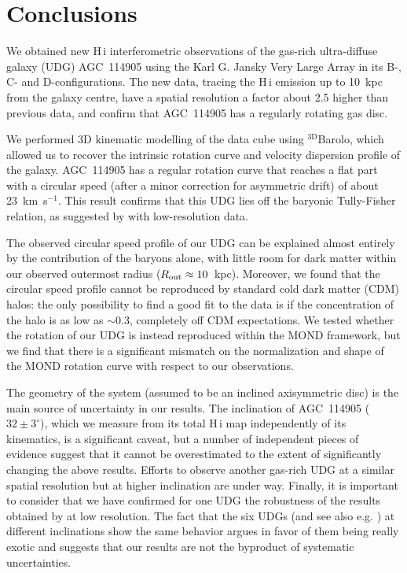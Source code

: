 \documentclass[fleqn,usenatbib]{mnras}
\begin{document}
\section{Conclusions}
\label{sec:conclusions}
We obtained new H\,{\sc i} interferometric observations of the gas-rich ultra-diffuse galaxy (UDG) AGC~114905 using the Karl G. Jansky Very Large Array in its B-, C- and D-configurations. The new data, tracing the H\,{\sc i} emission up to 10~kpc from the galaxy centre, have a spatial resolution a factor about 2.5 higher than previous data, and confirm that AGC~114905 has a regularly rotating gas disc.

We performed 3D kinematic modelling of the data cube using $\mathrm{^{3D}}$Barolo, which allowed us to recover the intrinsic rotation curve and velocity dispersion profile of the galaxy. AGC~114905 has a regular rotation curve that reaches a flat part with a circular speed (after a minor correction for asymmetric drift) of about 23~km~s$^{-1}$. This result confirms that this UDG lies off the baryonic Tully-Fisher relation, as suggested by \citet{huds2019,huds2020} with low-resolution data.

The observed circular speed profile of our UDG can be explained almost entirely by the contribution of the baryons alone, with little room for dark matter within our observed outermost radius ($R_{\rm out} \approx 10$~kpc). Moreover, we found that the circular speed profile cannot be reproduced by standard cold dark matter (CDM) halos: the only possibility to find a good fit to the data is if the concentration of the halo is as low as $\sim 0.3$, completely off CDM expectations. We tested whether the rotation of our UDG is instead reproduced within the MOND framework, but we find that there is a significant mismatch on the normalization and shape of the MOND rotation curve with respect to our observations.


The geometry of the system (assumed to be an inclined axisymmetric disc) is the main source of uncertainty in our results. The inclination of AGC~114905 ($32 \pm 3^\circ$), which we measure from its total H\,{\sc i} map independently of its kinematics, is a significant caveat, but a number of independent pieces of evidence suggest that it cannot be overestimated to the extent of significantly changing the above results. Efforts to observe another gas-rich UDG at a similar spatial resolution but at higher inclination are under way. Finally, it is important to consider that we have confirmed for one UDG the robustness of the results obtained by \citet{huds2019,huds2020} at low resolution. The fact that the six UDGs (and see also e.g. \citealt{leisman2017,shi2021}) at different inclinations show the same behavior argues in favor of them being really exotic and suggests that our results are not the byproduct of systematic uncertainties.
\end{document}
